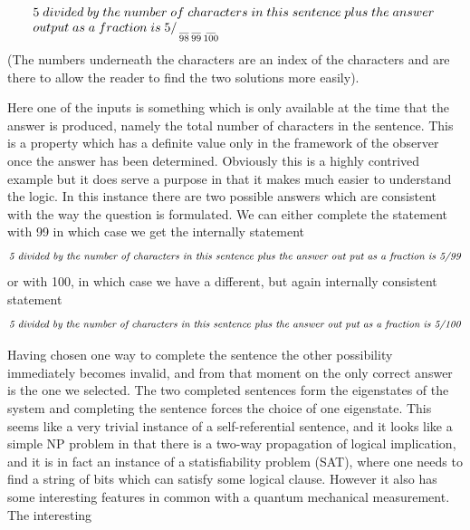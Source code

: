 \documentclass[
   ,final            %
  ]
  {aipproc}
\begin{document}
\begin{equation}
\begin{array}{l}
 5\; divided\; by\; the\; number\; of\; characters\; in\; this\; sentence\; plus\; the\; answer\;\\ 
 output\; as\; a\; fraction\; is\;
5 \mathord{\left/
 {\vphantom {5 {}}} \right.
 \kern-\nulldelimiterspace} {} 
 \mathop {\_}\limits_{98} 
 \mathop {\_}\limits_{99} 
 \mathop {\_}\limits_{100}
 \end{array} 
\end{equation}
(The numbers underneath the characters are an index of the characters and are there to allow the reader to
find the two solutions more easily).
\par
Here one of the inputs is something which is only available at the time that the answer is produced, namely the total number of characters in the %
sentence. This is a property which has a definite value only in the framework of the observer once the answer has been determined. Obviously this is a %
highly contrived example but it does serve a purpose in that it makes much easier to understand the logic. In this instance
there are two possible answers which are consistent with the way the question is formulated.
We can either complete the statement with 99 in which case we get the internally statement
\begin{equation}
\text{\emph{5 divided by the number of characters in this sentence plus the answer
out put as a fraction is 5/99}}
\end{equation}
or with 100, in which case we have a different, but again internally consistent statement
\begin{equation}
\text{\emph{5 divided by the number of characters in this sentence plus the answer
out put as a fraction is 5/100}}
\end{equation}
\par
Having chosen one way to complete the sentence the other possibility immediately becomes invalid, and
from that moment on the only correct answer is the one we selected. The two completed sentences form
the eigenstates of the system and completing the sentence forces the choice of one eigenstate.
This seems like a very trivial instance of a self-referential sentence, and it looks like a simple NP problem
in that there is a two-way propagation of logical implication, and it is in fact an instance of a statisfiability
problem (SAT), where one needs to find a string of bits which can satisfy some logical clause. However it
also has some interesting features in common with a quantum mechanical measurement. The interesting
\end{document}
